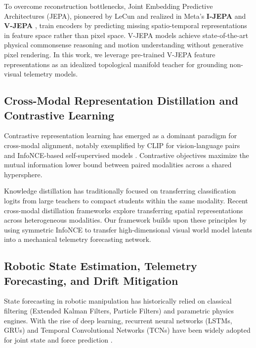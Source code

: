 \documentclass[11pt,a4paper]{article}
\begin{document}
To overcome reconstruction bottlenecks, Joint Embedding Predictive Architectures (JEPA), pioneered by LeCun \cite{lecun2022path} and realized in Meta's \textbf{I-JEPA} \cite{assran2023self} and \textbf{V-JEPA} \cite{bardes2024vjepa}, train encoders by predicting missing spatio-temporal representations in feature space rather than pixel space. V-JEPA models achieve state-of-the-art physical commonsense reasoning and motion understanding without generative pixel rendering. In this work, we leverage pre-trained V-JEPA feature representations as an idealized topological manifold teacher for grounding non-visual telemetry models.

\subsection{Cross-Modal Representation Distillation and Contrastive Learning}
Contrastive representation learning has emerged as a dominant paradigm for cross-modal alignment, notably exemplified by CLIP \cite{radford2021learning} for vision-language pairs and InfoNCE-based self-supervised models \cite{oord2018representation, he2020momentum, chen2020simple}. Contrastive objectives maximize the mutual information lower bound between paired modalities across a shared hypersphere.

Knowledge distillation \cite{hinton2015distilling, gou2021knowledge} has traditionally focused on transferring classification logits from large teachers to compact students within the same modality. Recent cross-modal distillation frameworks \cite{tian2020contrastive, gupta2016cross} explore transferring spatial representations across heterogeneous modalities. Our framework builds upon these principles by using symmetric InfoNCE to transfer high-dimensional visual world model latents into a mechanical telemetry forecasting network.

\subsection{Robotic State Estimation, Telemetry Forecasting, and Drift Mitigation}
State forecasting in robotic manipulation has historically relied on classical filtering (Extended Kalman Filters, Particle Filters) \cite{thrun2005probabilistic, welch1995introduction} and parametric physics engines. With the rise of deep learning, recurrent neural networks (LSTMs, GRUs) and Temporal Convolutional Networks (TCNs) have been widely adopted for joint state and force prediction \cite{hochreiter1997long, bai2018empirical}.
\end{document}
